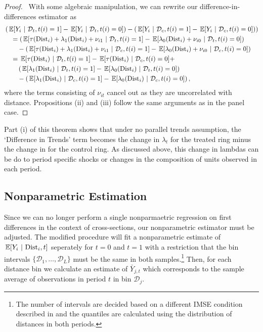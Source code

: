 \begin{proof}
  \ With some algebraic manipulation, we can rewrite our difference-in-differences estimator as
  \begin{align*}
    &\left(\expec{Y_{i}}{\mathcal{D}_t, t(i) = 1} - \expec{Y_{i}}{\mathcal{D}_t, t(i) = 0}\right) - \left(\expec{Y_{i}}{\mathcal{D}_c, t(i) = 1} - \expec{Y_{i}}{\mathcal{D}_c, t(i) = 0})\right) \\
    &\quad = \left(\expec{ \tau(\dist_i) + \lambda_1(\dist_i) + \nu_{i1}}{\mathcal{D}_t, t(i) = 1} - \expec{\lambda_0(\dist_i) + \nu_{i0}}{\mathcal{D}_t, t(i) = 0}\right) \\
    &\quad\quad - \left(\expec{ \tau(\dist_i) + \lambda_1(\dist_i) + \nu_{i1}}{\mathcal{D}_c, t(i) = 1} - \expec{\lambda_0(\dist_i) + \nu_{i0}}{\mathcal{D}_c, t(i) = 0}\right) \\
    &\quad = \expec{\tau(\dist_i)}{\mathcal{D}_t, t(i) = 1} - \expec{\tau(\dist_i)}{\mathcal{D}_c, t(i) = 0} + \\
    &\quad\quad \left( \expec{\lambda_1(\dist_i)}{\mathcal{D}_t, t(i) = 1} - \expec{\lambda_0(\dist_i)}{\mathcal{D}_t, t(i) = 0} \right) \\
    &\quad\quad - \left( \expec{\lambda_1(\dist_i)}{\mathcal{D}_c, t(i) = 1} - \expec{\lambda_0(\dist_i)}{\mathcal{D}_c, t(i) = 0} \right),
  \end{align*}
  where the terms consisting of $\nu_{it}$ cancel out as they are uncorrelated with distance. Propositions (ii) and (iii) follow the same arguments as in the panel case.
\end{proof}

Part (i) of this theorem shows that under no parallel trends assumption, the `Difference in Trends' term becomes the change in $\lambda_t$ for the treated ring minus the change in for the control ring. As discussed above, this change in lambdas can be do to period specific shocks or changes in the composition of units observed in each period.

\subsection{Nonparametric Estimation}

Since we can no longer perform a single nonparmaetric regression on first differences in the context of cross-sections, our nonparametric estimator must be adjusted. The modified procedure will fit a nonparametric estimate of $\expec{Y_i}{\dist_i, t}$ seperately for $t = 0$ and $t = 1$ with a restriction that the bin intervals $\{ \mathcal{D}_1, \dots, \mathcal{D}_{L} \}$ must be the same in both samples.\footnote{The number of  intervals are decided based on a different IMSE condition described in \cite{cattaneo2019binscatter} and the quantiles are calculated using the distribution of distances in both periods.} Then, for each distance bin we calculate an estimate of $\bar{Y}_{j,t}$ which corresponds to the sample average of observations in period $t$ in bin $\mathcal{D}_j$. 

